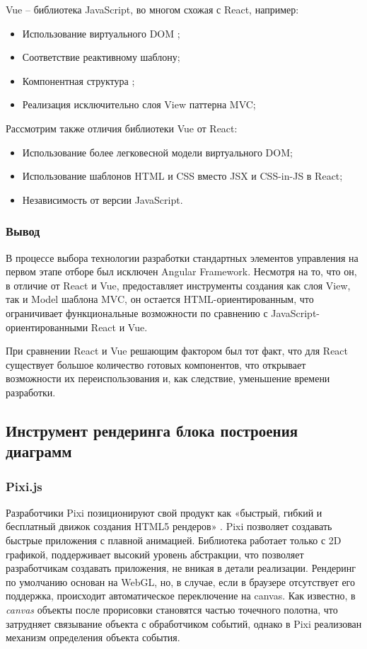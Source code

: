 Vue – библиотека JavaScript, во многом схожая с React, например:

\begin{itemize}
	\item Использование виртуального DOM \cite{vuejs};
	\item Соответствие реактивному шаблону;
	\item Компонентная структура \cite{vuejs};
	\item Реализация исключительно слоя View паттерна MVC;
\end{itemize}

Рассмотрим также отличия библиотеки Vue от React:

\begin{itemize}
	\item Использование более легковесной модели виртуального DOM;
	\item Использование шаблонов HTML и CSS вместо JSX и CSS-in-JS в React;
	\item Независимость от версии JavaScript.
\end{itemize}

\subsubsection{Вывод}

В процессе выбора технологии разработки стандартных элементов управления на первом этапе отборе был исключен Angular Framework. Несмотря на то, что он, в отличие от React и Vue, предоставляет инструменты создания как слоя View, так и Model шаблона MVC, он остается HTML-ориентированным, что ограничивает функциональные возможности по сравнению с JavaScript-ориентированными React и Vue.

При сравнении React и Vue решающим фактором был тот факт, что для React существует большое количество готовых компонентов, что открывает возможности их переиспользования и, как следствие, уменьшение времени разработки.

\subsection{Инструмент рендеринга блока построения диаграмм}

\subsubsection{Pixi.js}

Разработчики Pixi позиционируют свой продукт как «быстрый, гибкий и бесплатный движок создания HTML5 рендеров» \cite{pixijs}. Pixi позволяет создавать быстрые приложения с плавной анимацией. Библиотека работает только с 2D графикой, поддерживает высокий уровень абстракции, что позволяет разработчикам создавать приложения, не вникая в детали реализации. Рендеринг по умолчанию основан на WebGL, но, в случае, если в браузере отсутствует его поддержка, происходит автоматическое переключение на canvas. Как известно, в \textit{canvas} объекты после прорисовки становятся частью точечного полотна, что затрудняет связывание объекта с обработчиком событий, однако в Pixi реализован механизм определения объекта события.

